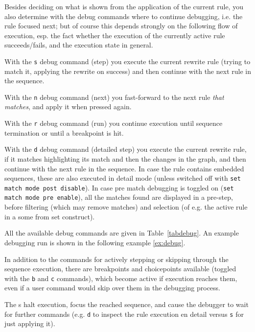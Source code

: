
Besides deciding on what is shown from the application of the current rule, you also determine with the debug commands where to continue debugging, i.e. the rule focused next;
but of course this depends strongly on the following flow of execution, esp. the fact whether the execution of the currently active rule succeeds/fails, and the execution state in general.


With the \texttt{s} debug command (step) you execute the current rewrite rule (trying to match it, applying the rewrite on success) and then continue with the next rule in the sequence.

With the \texttt{n} debug command (next) you fast-forward to the next rule \emph{that matches}, and apply it when pressed again.

With the \texttt{r} debug command (run) you continue execution until sequence termination or until a breakpoint is hit.

With the \texttt{d} debug command (detailed step) you execute the current rewrite rule, if it matches highlighting its match and then the changes in the graph, and then continue with the next rule in the sequence.
In case the rule contains embedded sequences, these are also executed in detail mode (unless switched off with \texttt{set match mode post disable}).
In case pre match debugging is toggled on (\texttt{set match mode pre enable}), all the matches found are displayed in a pre-step, before filtering (which may remove matches) and selection (of e.g. the active rule in a some from set construct).

All the available debug commands are given in Table~\ref{tabdebug}.
An example debugging run is shown in the following example \ref{ex:debug}.

\pagebreak

In addition to the commands for actively stepping or skipping through the sequence execution,
there are breakpoints and choicepoints available (toggled with the \texttt{b} and \texttt{c} commands),
which become active if execution reaches them, even if a user command would skip over them in the debugging process.

The s halt execution, focus the reached sequence, and cause the debugger to wait for further commands
(e.g. \texttt{d} to inspect the rule execution en detail versus \texttt{s} for just applying it).

